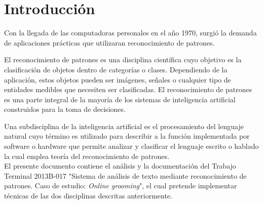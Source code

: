 \section{Introducci\'on}

Con la llegada de las computadoras personales en el a\~no 1970, surgi\'o la demanda de aplicaciones pr\'acticas que utilizaran reconocimiento de patrones.

El reconocimiento de patrones es una disciplina cient\'ifica cuyo objetivo es la clasificaci\'on de objetos dentro de categor\'ias o clases. Dependiendo de la aplicaci\'on, estos objetos pueden ser im\'agenes, se\~ nales o cualquier tipo de entidades medibles que necesiten ser clasificadas.\cite{reconoci} El reconocimiento de patrones es una parte integral de la mayor\'ia de los sistemas de inteligencia artificial construidos para la toma de decisiones.
        
Una subdisciplina de  la inteligencia artificial es el procesamiento del lenguaje natural cuyo t\'ermino es utilizado para describir a la funci\'on implementada por software o hardware que permite analizar y clasificar el lenguaje escrito o hablado la cual emplea teor\'ia del reconocimiento de patrones. \cite{intelig} \\

El presente documento contiene el an\'alisis y la documentaci\'on del Trabajo Terminal 2013B-017 "Sistema de an\'alisis de texto mediante reconocimiento de patrones. Caso de estudio: \textit{Online grooming}", el cual pretende implementar t\'ecnicas de las dos disciplinas descritas anteriormente.
\pagebreak